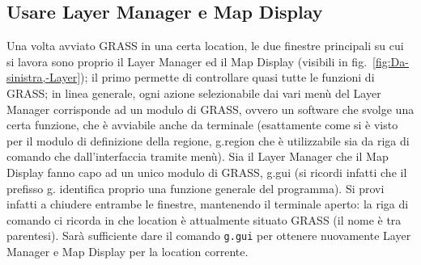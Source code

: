 	\subsection{Usare Layer Manager e Map Display}
		Una volta avviato GRASS in una certa location, le due finestre principali su cui si lavora sono proprio il Layer Manager ed il Map Display (visibili in fig.~\ref{fig:Da-sinistra,-Layer}); il primo permette di controllare quasi tutte le funzioni di GRASS; in linea generale, ogni azione selezionabile dai vari menù del Layer Manager corrisponde ad un modulo di GRASS, ovvero un software che svolge una certa funzione, che è avviabile anche da terminale (esattamente come si è visto per il modulo di definizione della regione, \textsf{g.region} che è utilizzabile sia da riga di comando che dall'interfaccia tramite menù). Sia il Layer Manager che il Map Display fanno capo ad un unico modulo di GRASS, \textsf{g.gui} (si ricordi infatti che il prefisso \textsf{g.} identifica proprio una funzione generale del programma). Si provi infatti a chiudere entrambe le finestre, mantenendo il terminale aperto: la riga di comando ci ricorda in che location è attualmente situato GRASS (il nome è tra parentesi). Sarà sufficiente dare il comando \texttt{g.gui} per ottenere nuovamente Layer Manager e Map Display per la location corrente.
		
